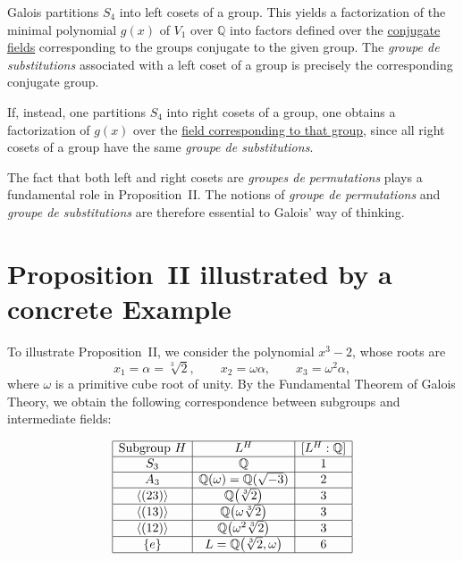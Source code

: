\documentclass[a4paper,11pt]{article}
\begin{document}
Galois partitions \(S_4\) into left cosets of a group. This yields a factorization of the minimal polynomial \(g(x)\) of \(V_1\) over \(\mathbb{Q}\) into factors defined over the \underline{conjugate fields} corresponding to the groups conjugate to the given group. The \textit{groupe de substitutions} associated with a left coset of a group is precisely the corresponding conjugate group.

If, instead, one partitions \(S_4\) into right cosets of a group, one obtains a factorization of \(g(x)\) over the \underline{field corresponding to that group}, since all right cosets of a group have the same \textit{groupe de substitutions}.

The fact that both left and right cosets are \textit{groupes de permutations} plays a fundamental role in Proposition~II. The notions of \textit{groupe de permutations} and \textit{groupe de substitutions} are therefore essential to Galois' way of thinking.
 		
\section{Proposition~II illustrated by a concrete Example}
\label{sec:voorbeeld}

To illustrate Proposition~II, we consider the polynomial \(x^3-2\), whose roots are
\[
x_1=\alpha=\sqrt[3]{2},\qquad
x_2=\omega\alpha,\qquad
x_3=\omega^2\alpha,
\]
where \(\omega\) is a primitive cube root of unity. By the Fundamental Theorem of Galois Theory, we obtain the following correspondence between subgroups and intermediate fields:

\[
\begin{array}{|c|c|c|}
	\hline
	\text{Subgroup }H & L^{H} & [L^{H}:\mathbb{Q}]\\
	\hline
	S_{3} &
	\mathbb{Q} &
	1\\
	\hline
	A_{3} &
	\mathbb{Q}(\omega)=\mathbb{Q}(\sqrt{-3}) &
	2\\
	\hline
	\langle(23)\rangle &
	\mathbb{Q}\!\left(\sqrt[3]{2}\right) &
	3\\
	\hline
	\langle(13)\rangle &
	\mathbb{Q}\!\left(\omega\sqrt[3]{2}\right) &
	3\\
	\hline
	\langle(12)\rangle &
	\mathbb{Q}\!\left(\omega^{2}\sqrt[3]{2}\right) &
	3\\
	\hline
	\{e\} &
	L=\mathbb{Q}\!\left(\sqrt[3]{2},\omega\right) &
	6\\
	\hline
\end{array}
\]
\end{document}
